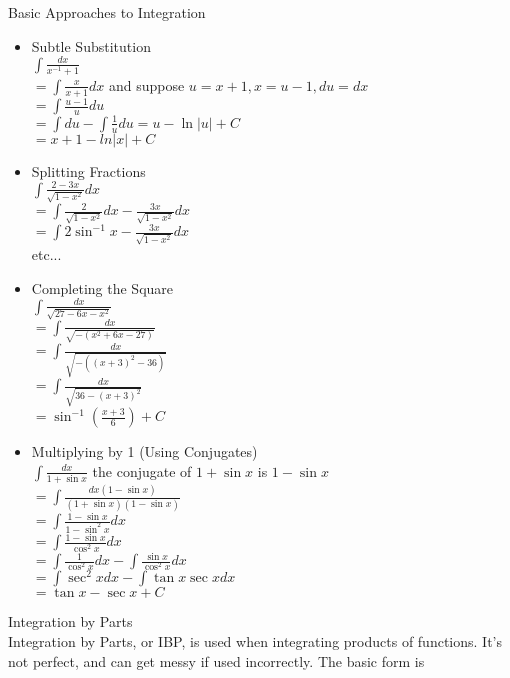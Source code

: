 \documentclass{article}
\begin{document}
\noindent
\Large
Basic Approaches to Integration\\
\normalsize
\begin{itemize}
  \item {
  Subtle Substitution\\
  $\int\frac{dx}{x^{-1}+1}$\\
  $=\int\frac{x}{x+1}dx$ and suppose $u = x + 1, x = u - 1, du = dx$\\
  $=\int\frac{u-1}{u}du$\\
  $=\int du - \int \frac{1}{u}du = u - \ln|u| + C$\\
  $= x+1 - ln|x| + C$
  }
  \item {
  Splitting Fractions\\
  $\int\frac{2-3x}{\sqrt{1-x^2}}dx$\\
  $=\int\frac{2}{\sqrt{1-x^2}}dx - \frac{3x}{\sqrt{1-x^2}}dx$\\
  $=\int 2\sin^{-1}x - \frac{3x}{\sqrt{1-x^2}}dx$\\
  etc...
  }
  \item {
  Completing the Square\\
  $\int\frac{dx}{\sqrt{27 - 6x - x^2}}$\\
  $=\int\frac{dx}{\sqrt{-(x^2 +6x -27)}}$\\
  $=\int\frac{dx}{\sqrt{-((x+3)^2 -36)}}$\\
  $=\int\frac{dx}{\sqrt{36 - (x+3)^2}}$\\
  $=\sin^{-1}(\frac{x+3}{6}) + C$\\
  }
  \item {
  Multiplying by 1 (Using Conjugates)\\
  $\int\frac{dx}{1 + \sin x}$ the conjugate of $1 + \sin x$ is $1 - \sin x$\\
  $=\int\frac{dx (1 - \sin x)}{(1 + \sin x)(1 - \sin x)}$\\
  $=\int\frac{1 - \sin x}{1 - \sin^2 x}dx$\\
  $=\int\frac{1 - \sin x}{\cos^2 x}dx$\\
  $=\int\frac{1}{\cos^2 x}dx - \int\frac{\sin x}{\cos^2 x}dx$\\
  $=\int \sec^2 x dx - \int \tan x \sec x dx$\\
  $=\tan x - \sec x + C$\\
  }
\end{itemize}

\noindent
\Large
Integration by Parts\\
\normalsize
\indent
Integration by Parts, or IBP, is used when integrating products of functions. It's not perfect, and can get messy if used incorrectly. The basic form is\\
\end{document}
